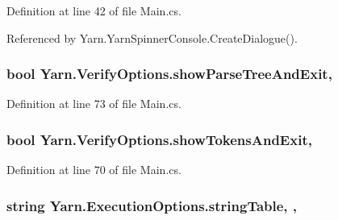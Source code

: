 Definition at line 42 of file Main.\-cs.



Referenced by Yarn.\-Yarn\-Spinner\-Console.\-Create\-Dialogue().

\hypertarget{a00192_abef6bf44ae4792d7644b1c02de625208}{
\subsubsection[{show\-Parse\-Tree\-And\-Exit}]{\setlength{\rightskip}{0pt plus 5cm}bool Yarn.\-Verify\-Options.\-show\-Parse\-Tree\-And\-Exit\hspace{0.3cm}{\ttfamily [get]}, {\ttfamily [set]}}}\label{a00192_abef6bf44ae4792d7644b1c02de625208}


Definition at line 73 of file Main.\-cs.

\hypertarget{a00192_ab1a387df201e3e136c15e5744219628d}{
\subsubsection[{show\-Tokens\-And\-Exit}]{\setlength{\rightskip}{0pt plus 5cm}bool Yarn.\-Verify\-Options.\-show\-Tokens\-And\-Exit\hspace{0.3cm}{\ttfamily [get]}, {\ttfamily [set]}}}\label{a00192_ab1a387df201e3e136c15e5744219628d}


Definition at line 70 of file Main.\-cs.

\hypertarget{a00103_a7e43c3b73722956cb0f5d507e4eef527}{
\subsubsection[{string\-Table}]{\setlength{\rightskip}{0pt plus 5cm}string Yarn.\-Execution\-Options.\-string\-Table\hspace{0.3cm}{\ttfamily [get]}, {\ttfamily [set]}, {\ttfamily [inherited]}}}\label{a00103_a7e43c3b73722956cb0f5d507e4eef527}


